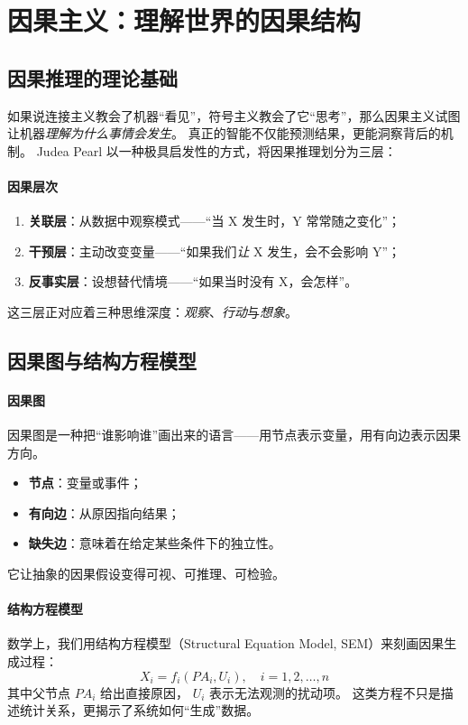 \section{因果主义：理解世界的因果结构}

\subsection{因果推理的理论基础}

如果说连接主义教会了机器“看见”，符号主义教会了它“思考”，那么因果主义试图让机器\emph{理解为什么事情会发生}。  
真正的智能不仅能预测结果，更能洞察背后的机制。  
Judea Pearl 以一种极具启发性的方式，将因果推理划分为三层：

\paragraph{因果层次}
\begin{enumerate}
\item \textbf{关联层}：从数据中观察模式——“当 X 发生时，Y 常常随之变化”；  
\item \textbf{干预层}：主动改变变量——“如果我们\emph{让} X 发生，会不会影响 Y”；  
\item \textbf{反事实层}：设想替代情境——“如果当时没有 X，会怎样”。  
\end{enumerate}
这三层正对应着三种思维深度：\emph{观察}、\emph{行动}与\emph{想象}。

\subsection{因果图与结构方程模型}

\paragraph{因果图}
因果图是一种把“谁影响谁”画出来的语言——用节点表示变量，用有向边表示因果方向。  
\begin{itemize}
\item \textbf{节点}：变量或事件；  
\item \textbf{有向边}：从原因指向结果；  
\item \textbf{缺失边}：意味着在给定某些条件下的独立性。  
\end{itemize}
它让抽象的因果假设变得可视、可推理、可检验。

\paragraph{结构方程模型}
数学上，我们用结构方程模型（Structural Equation Model, SEM）来刻画因果生成过程：
$$X_i = f_i(PA_i, U_i), \quad i = 1, 2, \ldots, n$$
其中父节点 $PA_i$ 给出直接原因， $U_i$ 表示无法观测的扰动项。  
这类方程不只是描述统计关系，更揭示了系统如何“生成”数据。

